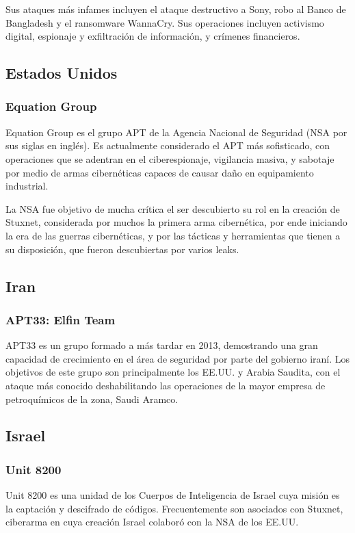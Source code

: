 \documentclass{article}
\begin{document}
Sus ataques más infames incluyen el ataque destructivo a Sony, robo al Banco de Bangladesh y el ransomware WannaCry. Sus operaciones incluyen activismo digital, espionaje y exfiltración de información, y crímenes financieros. \autocite{guardian-lazarus}

\subsection{Estados Unidos}
\subsubsection{Equation Group}
Equation Group es el grupo APT de la Agencia Nacional de Seguridad (NSA por sus siglas en inglés). Es actualmente considerado el APT más sofisticado, con operaciones que se adentran en el ciberespionaje, vigilancia masiva, y sabotaje por medio de armas cibernéticas capaces de causar daño en equipamiento industrial. \autocite{securelist-equation}

La NSA fue objetivo de mucha crítica el ser descubierto su rol en la creación de Stuxnet, considerada por muchos la primera arma cibernética, por ende iniciando la era de las guerras cibernéticas, y por las tácticas y herramientas que tienen a su disposición, que fueron descubiertas por varios leaks. \autocite{washingtonpost-stuxnet}

\subsection{Iran}
\subsubsection{APT33: Elfin Team}
APT33 es un grupo formado a más tardar en 2013, demostrando una gran capacidad de crecimiento en el área de seguridad por parte del gobierno iraní. Los objetivos de este grupo son principalmente los EE.UU. y Arabia Saudita, con el ataque más conocido deshabilitando las operaciones de la mayor empresa de petroquímicos de la zona, Saudi Aramco. \autocite{mandiant-apt33}

\subsection{Israel}
\subsubsection{Unit 8200}
Unit 8200 es una unidad de los Cuerpos de Inteligencia de Israel cuya misión es la captación y descifrado de códigos. Frecuentemente son asociados con Stuxnet, ciberarma en cuya creación Israel colaboró con la NSA de los EE.UU. \autocite{washingtonpost-stuxnet}
\end{document}

